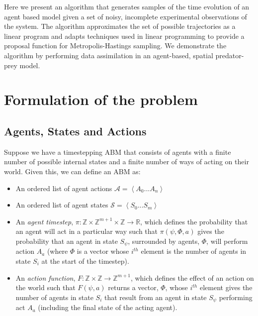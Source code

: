\documentclass{article}
\begin{document}
Here we present an algorithm that generates samples of the time evolution of an agent based model given a set of noisy, incomplete experimental observations of the system. The algorithm approximates the set of possible trajectories as a linear program and adapts techniques used in linear programming to provide a proposal function for Metropolis-Hastings sampling. We demonstrate the algorithm by performing data assimilation in an agent-based, spatial predator-prey model.


\section{Formulation of the problem}

\subsection{Agents, States and Actions}
\label{agentdef}
Suppose we have a timestepping ABM that consists of agents with a finite number of possible internal states and a finite number of ways of acting on their world. Given this, we can define an ABM as:
\begin{itemize}
	\item An ordered list of agent actions $\mathcal{A} =\left< A_0 ... A_n \right>$
	
	\item An ordered list of agent states $\mathcal{S} = \left<S_0 ... S_m\right>$
	
	\item An \textit{agent timestep}, $\pi : \mathbb{Z}\times\mathbb{Z}^{m+1}\times\mathbb{Z} \to \mathbb{R}$, which defines the probability that an agent will act in a particular way such that $\pi(\psi,\Phi,a)$ gives the probability that an agent in state $S_\psi$, surrounded by agents, $\Phi$, will perform action $A_a$ (where $\Phi$ is a vector whose $i^{th}$ element is the number of agents in state $S_i$ at the start of the timestep).
	
	\item An \textit{action function}, $F: \mathbb{Z} \times \mathbb{Z} \to \mathbb{Z}^{m+1}$, which defines the effect of an action on the world such that $F(\psi, a)$ returns a vector, $\Phi$, whose $i^{th}$ element gives the number of agents in state $S_i$ that result from an agent in state $S_\psi$ performing act $A_a$ (including the final state of the acting agent).
\end{itemize}
\end{document}
